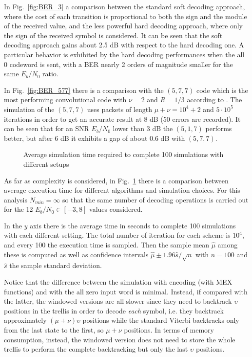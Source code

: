 \documentclass[10pt]{article}
\newlength\fheight
\newlength\fwidth
\begin{document}
In Fig.~\ref{fig:BER_3} a comparison between the standard soft decoding approach, where the cost of each transition is proportional to both the sign and the module of the received value, and the less powerful hard decoding approach, where only the sign of the received symbol is considered. 
It can be seen that the soft decoding approach gains about 2.5 dB with respect to the hard decoding one. A particular behavior is exhibited by the hard decoding performances when the all 0 codeword is sent, with a BER nearly 2 orders of magnitude smaller for the same $E_b/N_0$ ratio. 

In Fig.~\ref{fig:BER_577} there is a comparison with the $(5, 7, 7)$ code which is the most performing convolutional code with $\nu = 2$ and $R=1/3$ according to \cite{proakis}. The simulation of the $(5,7,7)$ uses packets of length $\mu + \nu = 10^4 + 2$ and $5\cdot10^{5}$ iterations in order to get an accurate result at 8 dB (50 errors are recorded). It can be seen that for an SNR $E_b/N_0$ lower than 3 dB the $(5,1,7)$ performs better, but after 6 dB it exhibits a gap of about 0.6 dB with $(5,7,7)$.

\begin{figure}[h!]
\centering
\setlength{}
\setlength{}

\caption{Average simulation time required to complete 100 simulations with different setups}
\label{fig:perf}
\end{figure}

As far as complexity is considered, in Fig.~\ref{fig:perf} there is a comparison between average execution time for different algorithms and simulation choices. 
For this analysis $N_{min} = \infty$ so that the same number of decoding operations is carried out for the 12 $E_b/N_0 \in [-3, 8]$ values considered. 

In the $y$ axis there is the average time in seconds to complete 100 simulations with each different setting. The total number of iteration for each scheme is $10^4$, and every 100 the execution time is sampled. Then the sample mean $\hat{\mu}$ among these is computed as well as confidence intervals $\hat{\mu} \pm 1.96\hat{s}/\sqrt{n}$ with $n=100$ and $\hat{s}$ the sample standard deviation.

Notice that the difference between the simulation with encoding (with MEX functions) and with the all zero input word is minimal. Instead, if compared with the latter, the windowed versions are all slower since they need to backtrack $\upsilon$ positions in the trellis in order to decode \emph{each} symbol, i.e. they backtrack approximately $(\mu + \nu)\upsilon$ positions while the standard Viterbi backtracks only from the last state to the first, so $\mu+\nu$ positions. In terms of memory consumption, instead, the windowed version does not need to store the whole trellis to perform the complete backtracking but only the last $\upsilon$ positions. 
\end{document}
